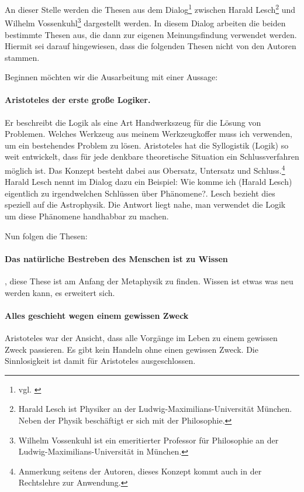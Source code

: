 An dieser Stelle werden die Thesen aus dem Dialog\footnote{vgl. \cite{Aristoteles3}} zwischen Harald Lesch\footnote{Harald Lesch ist Physiker an der Ludwig-Maximilians-Universität München. Neben der Physik beschäftigt er sich mit der Philosophie.} und Wilhelm Vossenkuhl\footnote{Wilhelm Vossenkuhl ist ein emeritierter Professor für Philosophie an der Ludwig-Maximilians-Universität in München.} dargestellt werden. In diesem Dialog arbeiten die beiden bestimmte Thesen aus, die dann zur eigenen Meinungsfindung verwendet werden. Hiermit sei darauf hingewiesen, dass die folgenden Thesen nicht von den Autoren stammen.

Beginnen möchten wir die Ausarbeitung mit einer Aussage:
\paragraph{\glqq Aristoteles der erste große Logiker\grqq. } Er beschreibt die Logik als eine Art Handwerkszeug für die Lösung von Problemen. Welches Werkzeug aus meinem Werkzeugkoffer muss ich verwenden, um ein bestehendes Problem zu lösen. Aristoteles hat die Syllogistik (Logik) so weit entwickelt, dass für jede denkbare theoretische Situation ein Schlussverfahren möglich ist. Das Konzept besteht dabei aus Obersatz, Untersatz und Schluss.\footnote{Anmerkung seitens der Autoren, dieses Konzept kommt auch in der Rechtslehre zur Anwendung.} Harald Lesch nennt im Dialog dazu ein Beispiel: \glqq Wie komme ich (Harald Lesch) eigentlich zu irgendwelchen Schlüssen über Phänomene?\grqq. Lesch bezieht dies speziell auf die Astrophysik. Die Antwort liegt nahe, man verwendet die Logik um diese Phänomene handhabbar zu machen.

Nun folgen die Thesen:
\paragraph{Das natürliche Bestreben des Menschen ist zu Wissen}, diese These ist am Anfang der Metaphysik zu finden. Wissen ist etwas was neu werden kann, es erweitert sich.  

\paragraph{Alles geschieht wegen einem gewissen Zweck} Aristoteles war der Ansicht, dass alle Vorgänge im Leben zu einem gewissen Zweck passieren. Es gibt kein Handeln ohne einen gewissen Zweck. Die Sinnlosigkeit ist damit für Aristoteles ausgeschlossen.

